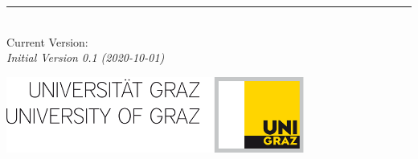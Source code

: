 \begin{titlepage}
	\flushright
	\hfill
	\vfill
	{\LARGE\thesisTitle \par}
	\rule[5pt]{\textwidth}{.4pt} \par
	{\Large\thesisName}
	\vfill
	\textit{\large\thesisDate} \\
	Current Version: \thesisVersion \\
	\textit{Initial Version 0.1 (2020-10-01)}
\end{titlepage}


\begin{titlepage}
	\tgherosfont
	\centering

	\includegraphics[height=25mm]{latex/img/KFU_generalLogo} \\[2mm]

	\vfill
	{\large \thesisSubject} \\[5mm]
	{\LARGE \color{ctcolortitle}\textbf{\thesisTitle} \\[10mm]}
	{\Large \thesisName} \\


\end{titlepage}
